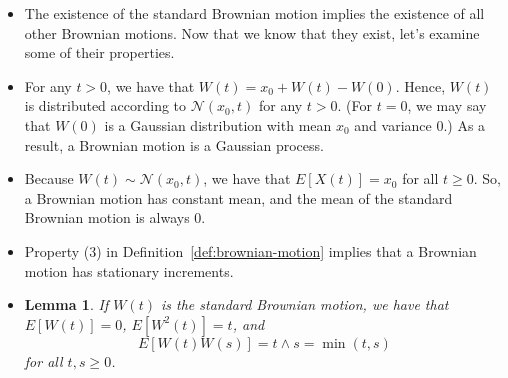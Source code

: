 \documentclass[10pt]{article}
\newtheorem{lemma}{Lemma}
\newcommand{\dee}{\mathrm{d}}
\newcommand{\mcal}[1]{\mathcal{#1}}
\begin{document}
\begin{itemize}
\begin{proof}[Proof sketch]
    From the Harr functions, define the {\bf Schauder functions} as
    \begin{align*}
      s_k(t) = \int_{0}^t h_k(u)\, \dee u
    \end{align*}
    for $t \in [0,1]$. The graph of $s_k$ is a tent of height $2^{-n/2-1}$ on the interval $[\frac{k-2^n}{2^n}, \frac{k+1-2^n}{2^n}]$.

    Let $\{ A_k \}_{k=0}^\infty$ be a sequence of independent $\mcal{N}(0,1)$ random variables. We can define
    \begin{align*}
      W(t,\omega) = \sum_{k=0}^\infty A_k(\omega) s_k(t),
    \end{align*}
    and it can be shown that this function has all the properties of the Brownian motion.
  \end{proof}

  \item The existence of the standard Brownian motion implies the existence of all other Brownian motions. Now that we know that they exist, let's examine some of their properties.

  \item For any $t > 0$, we have that $W(t) = x_0 + W(t) - W(0)$. Hence, $W(t)$ is distributed according to $\mcal{N}(x_0,t)$ for any $t > 0$. (For $t = 0$, we may say that $W(0)$ is a Gaussian distribution with mean $x_0$ and variance $0$.) As a result, a Brownian motion is a Gaussian process.
  
  \item Because $W(t) \sim \mcal{N}(x_0,t)$, we have that $E[X(t)] = x_0$ for all $t \geq 0$. So, a Brownian motion has constant mean, and the mean of the standard Brownian motion is always $0$.
  
  \item Property (3) in Definition~\ref{def:brownian-motion} implies that a Brownian motion has stationary increments.


  \item \begin{lemma}
    If $W(t)$ is the standard Brownian motion, we have that $E[W(t)] =0$, $E[W^2(t)] = t$, and $$E[W(t)W(s)] = t \wedge s = \min(t,s)$$ for all $t, s \geq 0$.
  \end{lemma}


\end{itemize}
\end{document}
